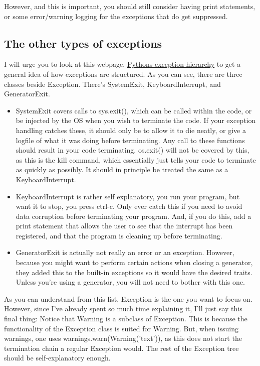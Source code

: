 \documentclass[10pt,a4paper]{article}
\begin{document}
However, and this is important, you should still consider having print statements, or some error/warning logging for the exceptions that do get suppressed.

\subsection{The other types of exceptions}

I will urge you to look at this webpage, \href{https://docs.python.org/2/library/exceptions.html\#exception-hierarchy}{Pythons exception hierarchy} to get a general idea of how exceptions are structured. As you can see, there are three classes beside Exception. There's SystemExit, KeyboardInterrupt, and GeneratorExit. 

\begin{itemize}

\item SystemExit covers calls to sys.exit(), which can be called within the code, or be injected by the OS when you wish to terminate the code. If your exception handling catches these, it should only be to allow it to die neatly, or give a logfile of what it was doing before terminating. Any call to these functions should result in your code terminating. os.exit() will not be covered by this, as this is the kill command, which essentially just tells your code to terminate as quickly as possibly. It should in principle be treated the same as a KeyboardInterrupt.

\item KeyboardInterrupt is rather self explanatory, you run your program, but want it to stop, you press ctrl-c. Only ever catch this if you need to avoid data corruption before terminating your program. And, if you do this, add a print statement that allows the user to see that the interrupt has been registered, and that the program is cleaning up before terminating.

\item GeneratorExit is actually not really an error or an exception. However, because you might want to perform certain actions when closing a generator, they added this to the built-in exceptions so it would have the desired traits. Unless you're using a generator, you will not need to bother with this one.

\end{itemize}

As you can understand from this list, Exception is the one you want to focus on. However, since I've already spent so much time explaining it, I'll just say this final thing: Notice that Warning is a subclass of Exception. This is because the functionality of the Exception class is suited for Warning. But, when issuing warnings, one uses warnings.warn(Warning('text')), as this does not start the termination chain a regular Exception would. The rest of the Exception tree should be self-explanatory enough. 
\end{document}
